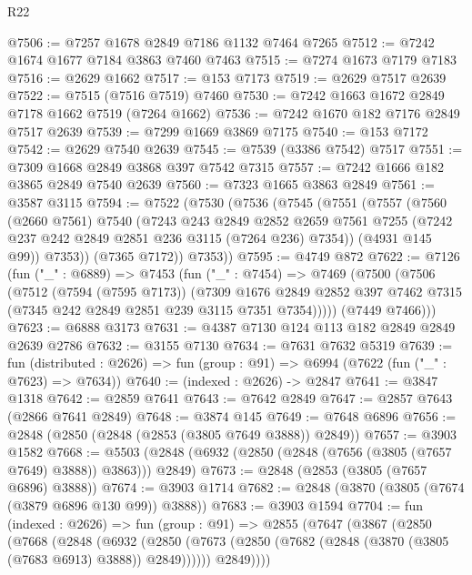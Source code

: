 \begin{lexlean}{R22}
\begin{coremodule}
@7506 := @7257 @1678 @2849 @7186 @1132 @7464 @7265
@7512 := @7242 @1674 @1677 @7184 @3863 @7460 @7463
@7515 := @7274 @1673 @7179 @7183
@7516 := @2629 @1662
@7517 := @153 @7173
@7519 := @2629 @7517 @2639
@7522 := @7515 (@7516 @7519) @7460
@7530 := @7242 @1663 @1672 @2849 @7178 @1662 @7519 (@7264 @1662)
@7536 := @7242 @1670 @182 @7176 @2849 @7517 @2639
@7539 := @7299 @1669 @3869 @7175
@7540 := @153 @7172
@7542 := @2629 @7540 @2639
@7545 := @7539 (@3386 @7542) @7517
@7551 := @7309 @1668 @2849 @3868 @397 @7542 @7315
@7557 := @7242 @1666 @182 @3865 @2849 @7540 @2639
@7560 := @7323 @1665 @3863 @2849
@7561 := @3587 @3115
@7594 := @7522
    (@7530
      (@7536
        (@7545
          (@7551
            (@7557
              (@7560
                (@2660 @7561)
                @7540
                (@7243
                  @243
                  @2849
                  @2852
                  @2659
                  @7561
                  @7255
                  (@7242 @237 @242 @2849 @2851 @236 @3115 (@7264 @236) @7354))
                (@4931 @145 @99))
              @7353))
          (@7365 @7172))
        @7353))
@7595 := @4749 @872
@7622 := @7126
    (fun ("_" : @6889) =>
    @7453
      (fun ("_" : @7454) =>
      @7469
        (@7500
          (@7506
            (@7512
              (@7594 (@7595 @7173))
              (@7309
                @1676
                @2849
                @2852
                @397
                @7462
                @7315
                (@7345 @242 @2849 @2851 @239 @3115 @7351 @7354)))))
        (@7449 @7466)))
@7623 := @6888 @3173
@7631 := @4387 @7130 @124 @113 @182 @2849 @2849 @2639 @2786
@7632 := @3155 @7130
@7634 := @7631 @7632 @5319
@7639 := fun (distributed : @2626) =>
  fun (group : @91) => @6994 (@7622 (fun ("_" : @7623) => @7634))
@7640 := (indexed : @2626) -> @2847
@7641 := @3847 @1318
@7642 := @2859 @7641
@7643 := @7642 @2849
@7647 := @2857 @7643 (@2866 @7641 @2849)
@7648 := @3874 @145
@7649 := @7648 @6896
@7656 := @2848 (@2850 (@2848 (@2853 (@3805 @7649 @3888)) @2849))
@7657 := @3903 @1582
@7668 := @5503 (@2848 (@6932 (@2850 (@2848 (@7656 (@3805 (@7657 @7649) @3888)) @3863))) @2849)
@7673 := @2848 (@2853 (@3805 (@7657 @6896) @3888))
@7674 := @3903 @1714
@7682 := @2848 (@3870 (@3805 (@7674 (@3879 @6896 @130 @99)) @3888))
@7683 := @3903 @1594
@7704 := fun (indexed : @2626) =>
  fun (group : @91) =>
  @2855
    (@7647
      (@3867
        (@2850
          (@7668
            (@2848
              (@6932
                (@2850 (@7673 (@2850 (@7682 (@2848 (@3870 (@3805 (@7683 @6913) @3888)) @2849))))))
              @2849))))

\end{coremodule}
\end{lexlean}
